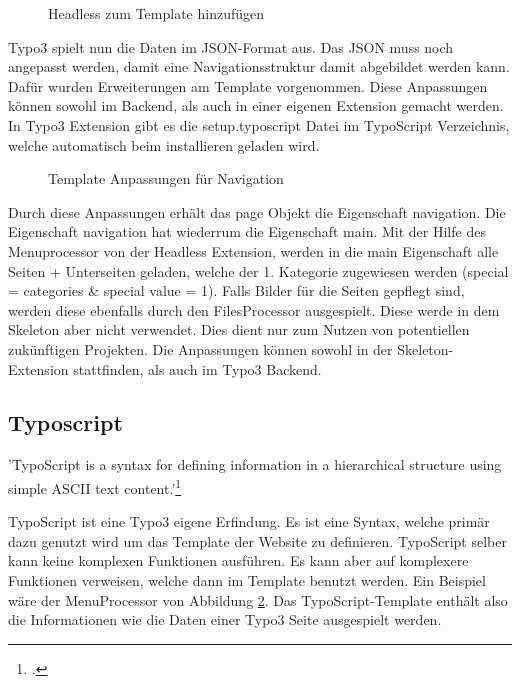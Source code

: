 \begin{figure}[htb]
\centering
{}
\caption{Headless zum Template hinzufügen}
\label{fig:Headless zum Template hinzufügen}
\end{figure}

Typo3 spielt nun die Daten im JSON-Format aus. Das JSON muss noch angepasst werden, damit eine Navigationsstruktur damit abgebildet werden kann. Dafür wurden Erweiterungen am Template vorgenommen. Diese Anpassungen können sowohl im Backend, als auch in einer eigenen Extension gemacht werden. In Typo3 Extension gibt es die setup.typoscript Datei im TypoScript Verzeichnis, welche automatisch beim installieren geladen wird. 

\begin{figure}[htb]
\centering
{}
\caption{Template Anpassungen für Navigation}
\label{fig:Template Anpassungen für Navigation}
\end{figure}


Durch diese Anpassungen erhält das page Objekt die Eigenschaft navigation. Die Eigenschaft navigation hat wiederrum die Eigenschaft main. Mit der Hilfe des Menuprocessor von der Headless Extension, werden in die main Eigenschaft alle Seiten + Unterseiten geladen, welche der 1. Kategorie zugewiesen werden (special = categories \& special value = 1). Falls Bilder für die Seiten gepflegt sind, werden diese ebenfalls durch den FilesProcessor ausgespielt. Diese werde in dem Skeleton aber nicht verwendet. Dies dient nur zum Nutzen von potentiellen zukünftigen Projekten. Die Anpassungen können sowohl in der Skeleton-Extension stattfinden, als auch im Typo3 Backend.

\subsection{Typoscript}
\label{sec:Typoscript}

'TypoScript is a syntax for defining information in a hierarchical structure using simple ASCII text content.'\footnote{\Vgl \citet{TypoScript}.}

TypoScript ist eine Typo3 eigene Erfindung. Es ist eine Syntax, welche primär dazu genutzt wird um das Template der Website zu definieren. TypoScript selber kann keine komplexen Funktionen ausführen. Es kann aber auf komplexere Funktionen verweisen, welche dann im Template benutzt werden. Ein Beispiel wäre der MenuProcessor von Abbildung \ref{fig:Template Anpassungen für Navigation}. Das TypoScript-Template enthält also die Informationen wie die Daten einer Typo3 Seite ausgespielt werden.

